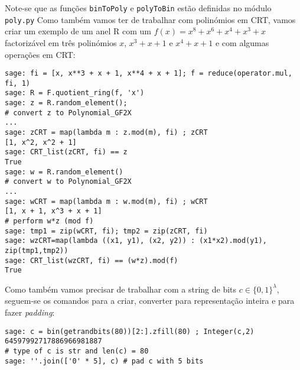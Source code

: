 Note-se que as funções \verb|binToPoly| e \verb|polyToBin| estão definidas no módulo \verb|poly.py|
Como também vamos ter de trabalhar com polinómios em CRT, vamos criar um exemplo de um anel \textsf{R} com um $f(x) = x^8 + x^6 + x^4 + x^3 + x$ factorizável em três polinómios $x$, $x^3 + x + 1$ e $x^4 + x + 1$ e com algumas operações em CRT:
\begin{lstlisting}[style=sage]
sage: fi = [x, x**3 + x + 1, x**4 + x + 1]; f = reduce(operator.mul, fi, 1)
sage: R = F.quotient_ring(f, 'x')
sage: z = R.random_element();
# convert z to Polynomial_GF2X
...
sage: zCRT = map(lambda m : z.mod(m), fi) ; zCRT
[1, x^2, x^2 + 1]
sage: CRT_list(zCRT, fi) == z
True
sage: w = R.random_element()
# convert w to Polynomial_GF2X
...
sage: wCRT = map(lambda m : w.mod(m), fi) ; wCRT
[1, x + 1, x^3 + x + 1]
# perform w*z (mod f)
sage: tmp1 = zip(wCRT, fi); tmp2 = zip(zCRT, fi)
sage: wzCRT=map(lambda ((x1, y1), (x2, y2)) : (x1*x2).mod(y1), zip(tmp1,tmp2))
sage: CRT_list(wzCRT, fi) == (w*z).mod(f)
True
\end{lstlisting}
Como também vamos precisar de trabalhar com a string de bits $c \in \{0, 1\}^\lambda$, seguem-se os comandos para a criar, converter para representação inteira e para fazer \textit{padding}:
\begin{lstlisting}[style=sage]
sage: c = bin(getrandbits(80))[2:].zfill(80) ; Integer(c,2)
64597992717886966981887
# type of c is str and len(c) = 80
sage: ''.join(['0' * 5], c) # pad c with 5 bits
\end{lstlisting}
